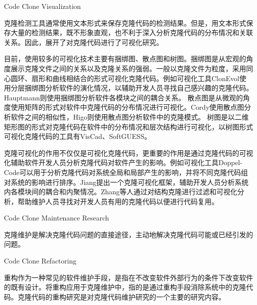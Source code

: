 {Code Clone Visualization}

克隆检测工具通常使用文本形式来保存克隆代码的检测结果。但是，用文本形式保存大量的检测结果，既不形象直观，也不利于深入分析克隆代码的分布情况和关联关系。因此，展开了对克隆代码进行了可视化研究。%

目前，使用较多的可视化技术主要有捆绑图、散点图和树图。捆绑图是从宏观的角度展示克隆文件之间的关系以及克隆关系的强弱。一般以克隆文件为粒度，采用同心圆环、扇形和曲线相结合的形式可视化克隆代码\cite{hanjalic2013clonevol}\cite{hauptmann2012using}\cite{voinea2014visual}。例如可视化工具ClonEvol使用分层捆绑图分析软件的演化情况，以辅助开发人员寻找自己感兴趣的克隆代码\cite{hanjalic2013clonevol}。Hauptmann则使用捆绑图分析软件各模块之间的耦合关系\cite{hauptmann2012using}。
散点图是从微观的角度使用矩阵的形式对软件中克隆代码的分布情况进行可视化\cite{cordy2011exploring}\cite{higo2007method}\cite{livieri2007very}。Cordy使用散点图分析软件之间的相似性\cite{cordy2011exploring}，Higo则使用散点图分析软件中的克隆模式\cite{higo2007method}\cite{livieri2007very}。
树图是以二维矩形图的形式对克隆代码在软件中的分布情况和层次结构进行可视化，以树图形式可视化克隆代码的工具有VisCad\cite{asaduzzaman2011viscad}\cite{uddin2015comprehension}、SoftGUESS\cite{adar2007softguess}。

克隆可视化的作用不仅仅是可视化克隆代码，更重要的作用是通过克隆代码的可视化辅助软件开发人员分析克隆代码对软件产生的影响。例如可视化工具Doppel-Code可以用于分析克隆代码对系统全局和局部产生的影响，并将不同克隆代码组对系统的影响进行排序\cite{forbes2012doppel}。Jiang提出一个克隆可视化框架，辅助开发人员分析系统内各模块间的耦合和内聚情况\cite{jiang2007framework}\cite{jiang2006visualizing}。Zhang等人通过对结构克隆进行过滤和可视化分析，帮助维护人员寻找对开发人员有用的克隆代码以便进行代码复用\cite{zhang2008query}。

{Code Clone Maintenance Research}


克隆维护是解决克隆代码问题的直接途径，主动地解决克隆代码可能或已经引发的问题。%

{Code Clone Refactoring}
\label{ref-clonerefactoring}

重构作为一种常见的软件维护手段，是指在不改变软件外部行为的条件下改变软件的既有设计\cite{kerievsky2006重构与模式}。将重构应用于克隆维护中，指的是通过重构手段消除系统中的克隆代码。克隆代码的重构研究是对克隆代码维护研究的一个主要的研究内容。

